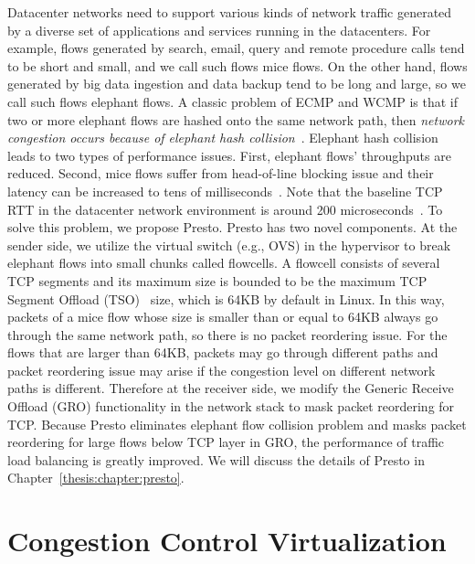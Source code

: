 Datacenter networks need to support various kinds of network traffic generated by 
a diverse set of applications and services running in the datacenters. For example, flows generated 
by search, email, query and remote procedure calls tend to be short and small, and we call such flows mice flows. 
On the other hand, flows generated by big data ingestion and data backup tend to be long and large, 
so we call such flows elephant flows. A classic problem of ECMP and WCMP is that if two or more elephant flows 
are hashed onto the same network path, then {\emph {network congestion occurs because of elephant 
hash collision}}~\cite{hedera,rasley2014planck}.
Elephant hash collision leads to two types of performance issues. First, elephant flows' throughputs are reduced. 
Second, mice flows suffer from head-of-line blocking issue and their latency can be increased to 
tens of milliseconds~\cite{alizadeh2012less}. 
Note that the baseline TCP RTT in the datacenter network environment is around 200 microseconds~\cite{he2016ac}. 
To solve this problem, we propose Presto. Presto has two novel components. At the sender side, 
we utilize the virtual switch (e.g., OVS) in the hypervisor to break elephant flows into small chunks 
called flowcells. A flowcell consists of several TCP segments and its maximum size is bounded to be the 
maximum TCP Segment Offload (TSO)~\cite{tcp-segment-offload} size, 
which is 64KB by default in Linux. In this way, packets of a mice flow whose size 
is smaller than or equal to 64KB always go through the same network path, so there is no packet reordering issue. 
For the flows that are larger than 64KB, packets may go through different paths and packet reordering 
issue may arise if the congestion level on different network paths is different. 
Therefore at the receiver side, we modify the Generic Receive Offload (GRO) functionality in the network stack to 
mask packet reordering for TCP. Because Presto eliminates elephant flow collision problem and 
masks packet reordering for large flows below TCP layer in GRO, the performance of 
traffic load balancing is greatly improved.
We will discuss the details of Presto in Chapter~\ref{thesis:chapter:presto}.


\section{Congestion Control Virtualization}

